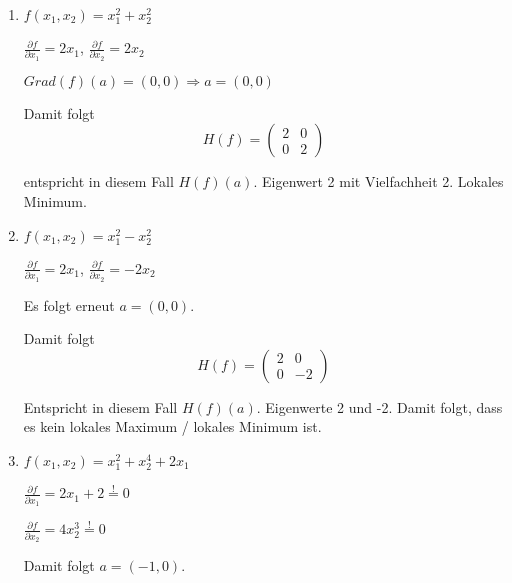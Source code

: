 \documentclass[a4paper, openany]{book}
\begin{document}
          \begin{enumerate}[label=(\alph*)]
            \item $f(x_1, x_2) = x_1^2 + x_2^2$

            \par \medskip

            $\frac{\partial f}{\partial x_1} = 2x_1$, $\frac{\partial f}{\partial x_2} = 2x_2$

            \par \medskip

            $Grad(f)(a) = (0,0) \Rightarrow a = (0,0)$

            Damit folgt \[ H(f) = \begin{pmatrix}2 & 0 \\ 0 & 2 \end{pmatrix} \]

            entspricht in diesem Fall $H(f)(a)$. Eigenwert 2 mit Vielfachheit 2. Lokales Minimum.

            \item $f(x_1, x_2) = x_1^2-x_2^2$

            \par \medskip

            $\frac{\partial f}{\partial x_1} = 2x_1$, $\frac{\partial f}{\partial x_2} = -2x_2$

            \par \medskip

            Es folgt erneut $a = (0,0)$.

            Damit folgt \[ H(f)= \begin{pmatrix}2 & 0 \\ 0 & -2 \end{pmatrix} \]

            Entspricht in diesem Fall $H(f)(a)$. Eigenwerte 2 und -2. Damit folgt, dass es kein lokales Maximum / lokales Minimum ist.

            \item $f(x_1, x_2) = x_1^2 + x_2^4 + 2x_1$

            \par \medskip

            $\frac{\partial f}{\partial x_1} = 2x_1+2 \overset{!}{=} 0$

            \par \medskip

            $\frac{\partial f}{\partial x_2} = 4x_2^3 \overset{!}{=} 0$

            Damit folgt $a = (-1, 0)$.


\end{enumerate}
\end{document}

